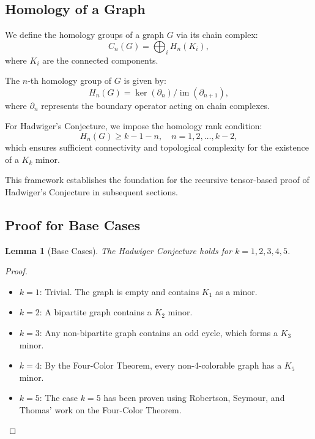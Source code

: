 \documentclass[11pt]{article}
\theoremstyle{plain}
\newtheorem{lemma}{Lemma}
\begin{document}
\subsection{Homology of a Graph}
We define the homology groups of a graph $G$ via its chain complex:
\begin{equation}
    C_n(G) = \bigoplus_{i} H_n(K_i),
\end{equation}
where $K_i$ are the connected components.

The $n$-th homology group of $G$ is given by:
\begin{equation}
    H_n(G) = \ker(\partial_n)/\operatorname{im}(\partial_{n+1}),
\end{equation}
where $\partial_n$ represents the boundary operator acting on chain complexes.

For Hadwiger’s Conjecture, we impose the homology rank condition:
\begin{equation}
    H_n(G) \geq k - 1 - n, \quad n = 1,2,\dots,k-2,
\end{equation}
which ensures sufficient connectivity and topological complexity for the existence of a $K_k$ minor.

This framework establishes the foundation for the recursive tensor-based proof of Hadwiger’s Conjecture in subsequent sections.

\subsection{Proof for Base Cases}

\begin{lemma}[Base Cases]
The Hadwiger Conjecture holds for $k = 1, 2, 3, 4, 5$.
\end{lemma}

\begin{proof}
\begin{itemize}
    \item $k = 1$: Trivial. The graph is empty and contains $K_1$ as a minor.
    \item $k = 2$: A bipartite graph contains a $K_2$ minor.
    \item $k = 3$: Any non-bipartite graph contains an odd cycle, which forms a $K_3$ minor.
    \item $k = 4$: By the Four-Color Theorem, every non-4-colorable graph has a $K_5$ minor.
    \item $k = 5$: The case $k = 5$ has been proven using Robertson, Seymour, and Thomas' work on the Four-Color Theorem.
\end{itemize}
\end{proof}
\end{document}
